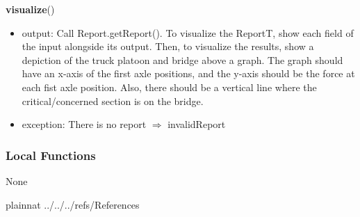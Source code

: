 \documentclass[12pt, titlepage]{article}
\begin{document}
\noindent \textbf{visualize}()
\begin{itemize}
\item output: Call Report.getReport(). To visualize the ReportT, show each field of the input alongside its output. Then, to visualize the results, show a depiction of the truck platoon and bridge above a graph. The graph should have an x-axis of the first axle positions, and the y-axis should be the force at each fist axle position. Also, there should be a vertical line where the critical/concerned section is on the bridge. 
\item exception: There is no report $\Rightarrow$ invalidReport
\end{itemize}
\subsubsection{Local Functions}
None

\newpage

 {plainnat}
 {../../../refs/References}
\end{document}
